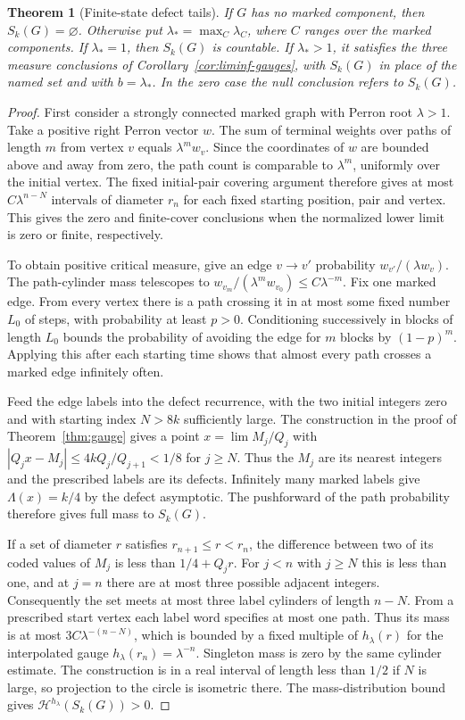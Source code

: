 \documentclass[11pt]{article}
\newtheorem{theorem}{Theorem}
\theoremstyle{definition}
\theoremstyle{remark}
\newcommand{\Lam}{\Lambda}
\begin{document}
\begin{theorem}[Finite-state defect tails]\label{thm:finite-state-tail}
If $G$ has no marked component, then $S_k(G)=\varnothing$.
Otherwise put $\lambda_*=\max_C\lambda_C$, where $C$ ranges over
the marked components. If $\lambda_*=1$, then $S_k(G)$ is countable.
If $\lambda_*>1$, it satisfies the three measure conclusions of
Corollary~\ref{cor:liminf-gauges}, with $S_k(G)$ in place of the named
set and with $b=\lambda_*$. In the zero case the null conclusion refers
to $S_k(G)$.
\end{theorem}

\begin{proof}
First consider a strongly connected marked graph with Perron root
$\lambda>1$. Take a positive right Perron vector $w$. The sum of
terminal weights over paths of length $m$ from vertex $v$ equals
$\lambda^m w_v$. Since the coordinates of $w$ are bounded above and
away from zero, the path count is comparable to $\lambda^m$, uniformly
over the initial vertex. The fixed initial-pair covering argument
therefore gives at most $C\lambda^{n-N}$ intervals of diameter $r_n$
for each fixed starting position, pair and vertex. This gives the
zero and finite-cover conclusions when the normalized lower limit is
zero or finite, respectively.

To obtain positive critical measure, give an edge $v\to v'$ probability
$w_{v'}/(\lambda w_v)$. The path-cylinder mass telescopes to
$w_{v_m}/(\lambda^m w_{v_0})\le C\lambda^{-m}$. Fix one marked edge.
From every vertex there is a path crossing it in at most some fixed
number $L_0$ of steps, with probability at least $p>0$. Conditioning
successively in blocks of length $L_0$ bounds the probability of
avoiding the edge for $m$ blocks by $(1-p)^m$. Applying this after each
starting time shows that almost every path crosses a marked edge
infinitely often.

Feed the edge labels into the defect recurrence, with the two
initial integers zero and with starting index $N>8k$ sufficiently
large. The construction in the proof of Theorem~\ref{thm:gauge} gives
a point $x=\lim M_j/Q_j$ with
$|Q_jx-M_j|\le 4kQ_j/Q_{j+1}<1/8$ for $j\ge N$.
Thus the $M_j$ are its nearest integers and the prescribed labels
are its defects. Infinitely many marked labels give $\Lam(x)=k/4$
by the defect asymptotic. The pushforward of the path probability
therefore gives full mass to $S_k(G)$.

If a set of diameter $r$ satisfies $r_{n+1}\le r<r_n$, the difference
between two of its coded values of $M_j$ is less than
$1/4+Q_jr$. For $j<n$ with $j\ge N$ this is less than one, and
at $j=n$ there are at most three possible adjacent integers.
Consequently the set meets at most three label cylinders of length
$n-N$. From a prescribed start vertex each label word specifies at
most one path. Thus its mass is at most $3C\lambda^{-(n-N)}$, which is
bounded by a fixed multiple of $h_\lambda(r)$ for the interpolated gauge
$h_\lambda(r_n)=\lambda^{-n}$. Singleton mass is zero by the same
cylinder estimate. The construction is in a real interval of length
less than $1/2$ if $N$ is large, so projection to the circle is
isometric there. The mass-distribution bound gives
$\mathcal H^{h_\lambda}(S_k(G))>0$.


\end{proof}
\end{document}
